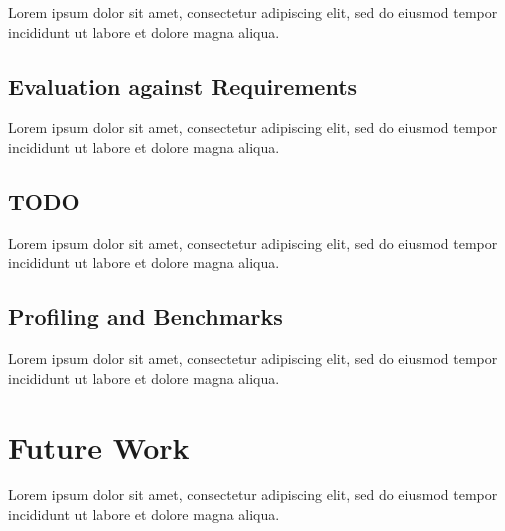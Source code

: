\documentclass[12pt, a4paper]{article}
\begin{document}
Lorem ipsum dolor sit amet, consectetur adipiscing elit, sed do eiusmod tempor incididunt ut labore et dolore magna aliqua.


\subsection{Evaluation against Requirements}

Lorem ipsum dolor sit amet, consectetur adipiscing elit, sed do eiusmod tempor incididunt ut labore et dolore magna aliqua.


\subsection{TODO}

Lorem ipsum dolor sit amet, consectetur adipiscing elit, sed do eiusmod tempor incididunt ut labore et dolore magna aliqua.


\subsection{Profiling and Benchmarks}

Lorem ipsum dolor sit amet, consectetur adipiscing elit, sed do eiusmod tempor incididunt ut labore et dolore magna aliqua.

\pagebreak


\section{Future Work}





Lorem ipsum dolor sit amet, consectetur adipiscing elit, sed do eiusmod tempor incididunt ut labore et dolore magna aliqua.
\end{document}
